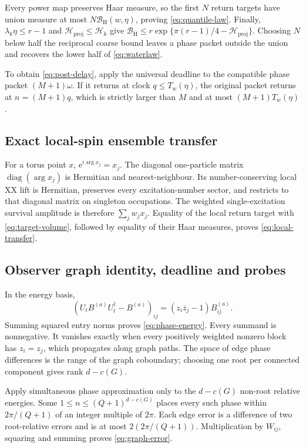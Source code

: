 \documentclass[10pt]{article}
\theoremstyle{definition}
\newcommand{\proj}{\mathrm{proj}}
\newcommand{\Hwater}{\mathcal H}
\newcommand{\Bhaar}{\mathcal B_{\mathrm H}}
\newcommand{\ee}{\mathrm e}
\begin{document}
Every power map preserves Haar measure, so the first \(N\) return targets
have union measure at most \(N\Bhaar(w,\eta)\), proving
\eqref{eq:quantile-law}.  Finally,
\(\lambda_k\eta\leq r-1\) and
\(\Hwater_{\proj}\leq\Hwater_k\) give
\(\Bhaar\leq r\exp\{\pi(r-1)/4-\Hwater_{\proj}\}\).
Choosing \(N\) below half the reciprocal coarse bound leaves a phase packet
outside the union and recovers the lower half of \eqref{eq:waterlaw}.

To obtain \eqref{eq:post-delay}, apply the universal deadline to the compatible
phase packet \((M+1)\omega\).  If it returns at clock \(q\leq T_w(\eta)\),
the original packet returns at \(n=(M+1)q\), which is strictly larger than
\(M\) and at most \((M+1)T_w(\eta)\).

\subsection*{Exact local-spin ensemble transfer}

For a torus point \(x\), \(\ee^{i\arg x_j}=x_j\).  The diagonal
one-particle matrix \(\operatorname{diag}(\arg x_j)\) is Hermitian and
nearest-neighbour.  Its number-conserving local XX lift is Hermitian,
preserves every excitation-number sector, and restricts to that diagonal
matrix on singleton occupations.  The weighted single-excitation survival
amplitude is therefore \(\sum_jw_jx_j\).  Equality of the local return target
with \eqref{eq:target-volume}, followed by equality of their Haar measures,
proves \eqref{eq:local-transfer}.

\subsection*{Observer graph identity, deadline and probes}

In the energy basis,
\[
 (U_tB^{(a)}U_t^\dagger-B^{(a)})_{ij}
 =(z_i\overline z_j-1)B^{(a)}_{ij}.
\]
Summing squared entry norms proves \eqref{eq:phase-energy}.  Every summand is
nonnegative.  It vanishes exactly when every positively weighted nonzero
block has \(z_i=z_j\), which propagates along graph paths.  The space of edge
phase differences is the range of the graph coboundary; choosing one root
per connected component gives rank \(d-c(G)\).

Apply simultaneous phase approximation only to the \(d-c(G)\) non-root
relative energies.  Some \(1\leq n\leq(Q+1)^{d-c(G)}\) places every such
phase within \(2\pi/(Q+1)\) of an integer multiple of \(2\pi\).  Each edge
error is a difference of two root-relative errors and is at most
\(2(2\pi/(Q+1))\).  Multiplication by \(W_{ij}\), squaring and summing proves
\eqref{eq:graph-error}.
\end{document}
